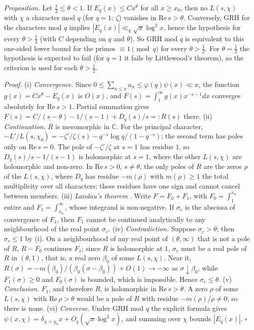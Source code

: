 \documentclass[11pt,a4paper]{article}
\theoremstyle{definition}\newtheorem{definition}[proposition]{Definition}
\theoremstyle{remark}\newtheorem{remark}[proposition]{Remark}
\begin{document}
\emph{Proposition.} Let $\tfrac12\le\theta<1$. If $E_q(x)\le Cx^\theta$ for all $x\ge x_0$, then no $L(s,\chi)$ with $\chi$ a character mod $q$ (for $q=1$: $\zeta$) vanishes in $\mathrm{Re}\,s>\theta$. Conversely, GRH for the characters mod $q$ implies $|E_q(x)|\ll_q\sqrt x\log^2x$, hence the hypothesis for every $\theta>\tfrac12$ (with $C$ depending on $q$ and $\theta$). So GRH mod $q$ is equivalent to this one-sided lower bound for the primes $\equiv1\pmod q$ for every $\theta>\tfrac12$. For $\theta=\tfrac12$ the hypothesis is expected to fail (for $q=1$ it fails by Littlewood's theorem), so the criterion is used for each $\theta>\tfrac12$.

\emph{Proof.} (i) \emph{Convergence.} Since $0\le\sum_{n\le x}a_n\le\varphi(q)\psi(x)\ll x$, the function $g(x)=Cx^\theta-E_q(x)$ is $O(x)$, and $F(s)=\int_1^\infty g(x)x^{-s-1}dx$ converges absolutely for $\mathrm{Re}\,s>1$. Partial summation gives $F(s)=C/(s-\theta)-1/(s-1)+D_q(s)/s=:R(s)$ there. (ii) \emph{Continuation.} $R$ is meromorphic in $\mathbb C$. For the principal character, $-L'/L(s,\chi_0)=-\zeta'/\zeta(s)-q^{-s}\log q/(1-q^{-s})$; the second term has poles only on $\mathrm{Re}\,s=0$. The pole of $-\zeta'/\zeta$ at $s=1$ has residue $1$, so $D_q(s)/s-1/(s-1)$ is holomorphic at $s=1$, where the other $L(s,\chi)$ are holomorphic and non-zero. In $\mathrm{Re}\,s>0$, $s\ne\theta$, the only poles of $R$ are the zeros $\rho$ of the $L(s,\chi)$, where $D_q$ has residue $-m(\rho)$ with $m(\rho)\ge1$ the total multiplicity over all characters; these residues have one sign and cannot cancel between members. (iii) \emph{Landau's theorem} \cite[Ch.~II]{Widder1941}. Write $F=F_0+F_1$, with $F_0=\int_1^{x_0}$ entire and $F_1=\int_{x_0}^\infty$, whose integrand is non-negative. If $\sigma_c$ is the abscissa of convergence of $F_1$, then $F_1$ cannot be continued analytically to any neighbourhood of the real point $\sigma_c$. (iv) \emph{Contradiction.} Suppose $\sigma_c>\theta$; then $\sigma_c\le1$ by (i). On a neighbourhood of any real point of $(\theta,\infty)$ that is not a pole of $R$, $R-F_0$ continues $F_1$; since $R$ is holomorphic at $1$, $\sigma_c$ must be a real pole of $R$ in $(\theta,1)$, that is, a real zero $\beta_0$ of some $L(s,\chi)$. Near it, $R(\sigma)=-m(\beta_0)/(\beta_0(\sigma-\beta_0))+O(1)\to-\infty$ as $\sigma\downarrow\beta_0$, while $F_1(\sigma)\ge0$ and $F_0(\sigma)$ is bounded, which is impossible. Hence $\sigma_c\le\theta$. (v) \emph{Conclusion.} $F_1$, and therefore $R$, is holomorphic in $\mathrm{Re}\,s>\theta$. A zero $\rho$ of some $L(s,\chi)$ with $\mathrm{Re}\,\rho>\theta$ would be a pole of $R$ with residue $-m(\rho)/\rho\ne0$; so there is none. (vi) \emph{Converse.} Under GRH mod $q$ the explicit formula gives $\psi(x,\chi)=\delta_{\chi=\chi_0}x+O_q(\sqrt x\log^2x)$, and summing over $\chi$ bounds $|E_q(x)|$. $\square$
\end{document}

